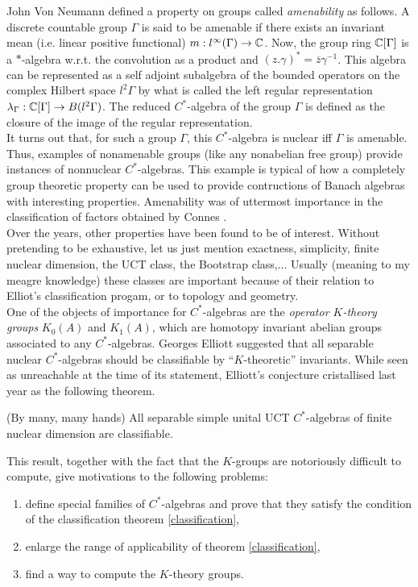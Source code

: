 John Von Neumann defined a property on groups called \textit{amenability} as follows. A discrete countable group $\Gamma$ is said to be amenable if there exists an invariant mean (i.e. linear positive functional) $m: l^\infty(\Gamma)\rightarrow \mathbb{C}$. Now, the group ring $\mathbb{C}[\Gamma]$ is a $*$-algebra w.r.t. the convolution as a product and $(z. \gamma)^* = \overline{z}\gamma^{-1}$. This algebra can be represented as a self adjoint subalgebra of the bounded operators on the complex Hilbert space $l^2\Gamma$ by what is called the left regular representation $\lambda_\Gamma: \mathbb{C}[\Gamma]\rightarrow B(l^2\Gamma)$. The reduced $C^*$-algebra of the group $\Gamma$ is defined as the closure of the image of the regular representation.\\

It turns out that, for such a group $\Gamma$, this $C^*$-algebra is nuclear iff $\Gamma$ is amenable. Thus, examples of nonamenable groups (like any nonabelian free group) provide instances of nonnuclear $C^*$-algebras. This example is typical of how a completely group theoretic property can be used to provide contructions of Banach algebras with interesting properties. Amenability was of uttermost importance in the classification of factors obtained by Connes \cite{}. \\ 

Over the years, other properties have been found to be of interest. Without pretending to be exhaustive, let us just mention exactness, simplicity, finite nuclear dimension, the UCT class, the Bootstrap class,... Usually (meaning to my meagre knowledge) these classes are important because of their relation to Elliot's classification progam, or to topology and geometry. \\

One of the objects of importance for $C^*$-algebras are the \textit{operator $K$-theory groups} $K_0(A)$ and $K_1(A)$, which are homotopy invariant abelian groups associated to any $C^*$-algebras. Georges Elliott suggested that all separable nuclear $C^*$-algebras should be classifiable by ``$K$-theoretic'' invariants. While seen as unreachable at the time of its statement, Elliott's conjecture cristallised last year as the following theorem.

\begin{theorem}\label{classification}(By many, many hands) All separable simple unital UCT $C^*$-algebras of finite nuclear dimension are classifiable.
\end{theorem}

This result, together with the fact that the $K$-groups are notoriously difficult to compute, give motivations to the following problems:
\begin{enumerate}
\item define special families of $C^*$-algebras and prove that they satisfy the condition of the classification theorem \ref{classification},
\item enlarge the range of applicability of theorem \ref{classification},
\item find a way to compute the $K$-theory groups.
\end{enumerate}    



      
